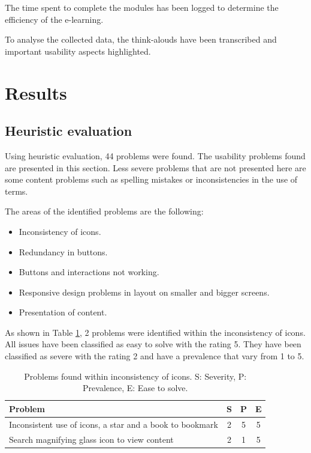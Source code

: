 \documentclass{sigchi}
\begin{document}
The time spent to complete the modules has been logged to determine the efficiency of the e-learning. 

To analyse the collected data, the think-alouds have been transcribed and important usability aspects highlighted. 


\section{Results}
\raggedbottom

\subsection{Heuristic evaluation}
Using heuristic evaluation, 44 problems were found. The usability problems found are presented in this section. Less severe problems that are not presented here are some content problems such as spelling mistakes or inconsistencies in the use of terms. 

The areas of the identified problems are the following:

\begin{itemize}[noitemsep]
    \item Inconsistency of icons.
    \item Redundancy in buttons.
    \item Buttons and interactions not working.
    \item Responsive design problems in layout on smaller and bigger screens.
    \item Presentation of content.
\end{itemize}

As shown in Table \ref{tab:icons}, 2 problems were identified within the inconsistency of icons. All issues have been classified as easy to solve with the rating 5. They have been classified as severe with the rating 2 and have a prevalence that vary from 1 to 5. 

\begin{table}[H]
    \centering
    \begin{tabular}{|m{6.5cm}|c|c|c|}
    \hline
        \textbf{Problem} & \textbf{S} & \textbf{P} & \textbf{E}\\
    \hline
         Inconsistent use of icons, a star and a book to bookmark  & 2 & 5 & 5\\
    \hline
         Search magnifying glass icon to view content & 2 & 1 & 5\\
    \hline
    \end{tabular}
    \caption{Problems found within inconsistency of icons. S: Severity, P: Prevalence, E: Ease to solve.}
    \label{tab:icons}
\end{table}
\end{document}
